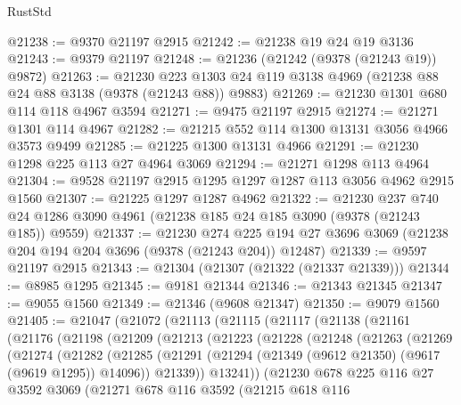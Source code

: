 \begin{lexlean}{RustStd}
\begin{coremodule}
@21238 := @9370 @21197 @2915
@21242 := @21238 @19 @24 @19 @3136
@21243 := @9379 @21197
@21248 := @21236 (@21242 (@9378 (@21243 @19)) @9872)
@21263 := @21230
    @223
    @1303
    @24
    @119
    @3138
    @4969
    (@21238 @88 @24 @88 @3138 (@9378 (@21243 @88)) @9883)
@21269 := @21230 @1301 @680 @114 @118 @4967 @3594
@21271 := @9475 @21197 @2915
@21274 := @21271 @1301 @114 @4967
@21282 := @21215 @552 @114 @1300 @13131 @3056 @4966 @3573 @9499
@21285 := @21225 @1300 @13131 @4966
@21291 := @21230 @1298 @225 @113 @27 @4964 @3069
@21294 := @21271 @1298 @113 @4964
@21304 := @9528 @21197 @2915 @1295 @1297 @1287 @113 @3056 @4962 @2915 @1560
@21307 := @21225 @1297 @1287 @4962
@21322 := @21230
    @237
    @740
    @24
    @1286
    @3090
    @4961
    (@21238 @185 @24 @185 @3090 (@9378 (@21243 @185)) @9559)
@21337 := @21230
    @274
    @225
    @194
    @27
    @3696
    @3069
    (@21238 @204 @194 @204 @3696 (@9378 (@21243 @204)) @12487)
@21339 := @9597 @21197 @2915
@21343 := @21304 (@21307 (@21322 (@21337 @21339)))
@21344 := @8985 @1295
@21345 := @9181 @21344
@21346 := @21343 @21345
@21347 := @9055 @1560
@21349 := @21346 (@9608 @21347)
@21350 := @9079 @1560
@21405 := @21047
    (@21072
      (@21113
        (@21115
          (@21117
            (@21138
              (@21161
                (@21176
                  (@21198
                    (@21209
                      (@21213
                        (@21223
                          (@21228
                            (@21248
                              (@21263
                                (@21269
                                  (@21274
                                    (@21282
                                      (@21285
                                        (@21291
                                          (@21294
                                            (@21349 (@9612 @21350) (@9617 (@9619 @1295)) @14096))
                                          @21339))
                                      @13241))
                                  (@21230
                                    @678
                                    @225
                                    @116
                                    @27
                                    @3592
                                    @3069
                                    (@21271
                                      @678
                                      @116
                                      @3592
                                      (@21215
                                        @618
                                        @116

\end{coremodule}
\end{lexlean}
